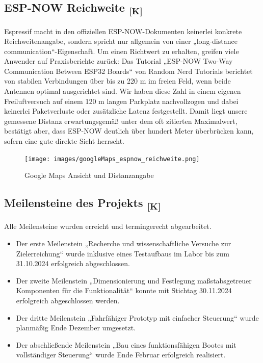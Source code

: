 \documentclass[a4paper,12pt]{article}
\begin{document}
\subsection{\texorpdfstring{ESP-NOW Reichweite \textsubscript{[K]}}{ESP-NOW Reichweite [K]}}
Espressif macht in den offiziellen ESP-NOW-Dokumenten keinerlei konkrete Reichweitenangabe, sondern spricht nur allgemein von einer „long-distance communication“-Eigenschaft. Um einen Richtwert zu erhalten, greifen viele Anwender auf Praxisberichte zurück: Das Tutorial „ESP-NOW Two-Way Communication Between ESP32 Boards“ von Random Nerd Tutorials\cite{RNT2025} berichtet von stabilen Verbindungen über bis zu 220 m im freien Feld, wenn beide Antennen optimal ausgerichtet sind. \newline
Wir haben diese Zahl in einem eigenen Freiluftversuch auf einem 120 m langen Parkplatz nachvollzogen und dabei keinerlei Paketverluste oder zusätzliche Latenz festgestellt. Damit liegt unsere gemessene Distanz erwartungsgemäß unter dem oft zitierten Maximalwert, bestätigt aber, dass ESP-NOW deutlich über hundert Meter überbrücken kann, sofern eine gute direkte Sicht herrscht.
\begin{figure}[H]
    \centering
    \texttt{[image: images/googleMaps\_espnow\_reichweite.png]}
    \caption{Google Maps Ansicht und Distanzangabe}
    \label{fig:Google Maps}
\end{figure}

\subsection{\texorpdfstring{Meilensteine des Projekts \textsubscript{[K]}}{Meilensteine des Projekts [K]}}

Alle Meilensteine wurden erreicht und termingerecht abgearbeitet.\newline

\begin{itemize}
    \item Der erste Meilenstein „Recherche und wissenschaftliche Versuche zur Zielerreichung“ wurde inklusive eines Testaufbaus im Labor bis zum 31.10.2024 erfolgreich abgeschlossen.

    \item Der zweite Meilenstein „Dimensionierung und Festlegung maßstabsgetreuer Komponenten für die Funktionalität“ konnte mit Stichtag 30.11.2024 erfolgreich abgeschlossen werden.

    \item Der dritte Meilenstein „Fahrfähiger Prototyp mit einfacher Steuerung“ wurde planmäßig Ende Dezember umgesetzt.

    \item Der abschließende Meilenstein „Bau eines funktionsfähigen Bootes mit vollständiger Steuerung“ wurde Ende Februar erfolgreich realisiert.
\end{itemize}
\end{document}
